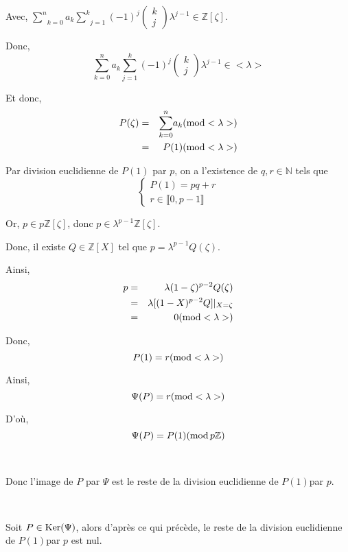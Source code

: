 Avec, $\underset{k = 0}{\overset{n}{\sum}} a_k \underset{j =
1}{\overset{k}{\sum}} (- 1)^j \left( \begin{array}{c}
  k\\
  j
\end{array} \right) \lambda^{j - 1} \in \mathbb{Z} [\zeta]$.

Donc,
\[ \underset{k = 0}{\overset{n}{\sum}} a_k \underset{j = 1}{\overset{k}{\sum}}
   (- 1)^j \left( \begin{array}{c}
     k\\
     j
   \end{array} \right) \lambda^{j - 1} \in < \lambda > \]


Et donc,
\begin{eqnarray*}
  P (\zeta) & = & \underset{k = 0}{\overset{n}{\sum}} a_k  (\operatorname{mod} <
  \lambda >)\\
  & = & P (1)  (\operatorname{mod} < \lambda >)
\end{eqnarray*}


Par division euclidienne de $P (1)$ par $p$, on a l'existence de $q, r \in
\mathbb{N}$ tels que
\[ \left\{\begin{array}{l}
     P (1) = p q + r\\
     r \in \llbracket 0, p - 1 \rrbracket
   \end{array}\right. \]


Or, $p \in p\mathbb{Z} [\zeta]$, donc $p \in \lambda^{p - 1} \mathbb{Z}
[\zeta]$.

Donc, il existe $Q \in \mathbb{Z} [X]$ tel que $p = \lambda^{p - 1} Q
(\zeta)$.

Ainsi,
\begin{eqnarray*}
  p & = & \lambda (1 - \zeta)^{p - 2} Q (\zeta)\\
  & = & \lambda  [(1 - X)^{p - 2} Q] |_{X = \zeta}\\
  & = & 0 (\operatorname{mod} < \lambda >)
\end{eqnarray*}


Donc,
\[ P (1) = r (\operatorname{mod} < \lambda >) \]


Ainsi,
\[ \Psi (P) = r (\operatorname{mod} < \lambda >) \]


D'o{\`u},
\[ \Psi (P) = P (1)  (\operatorname{mod} p\mathbb{Z}) \]


\

Donc l'image de $P$ par $\Psi$ est le reste de la division euclidienne de $P
(1) $par $p$.

\

Soit $P \in \operatorname{Ker} (\Psi)$, alors d'apr{\`e}s ce qui pr{\'e}c{\`e}de, le
reste de la division euclidienne de $P (1) $par $p$ est nul.

